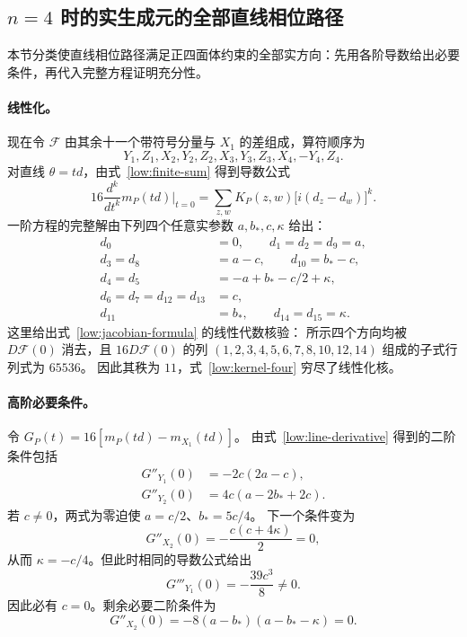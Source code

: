 \subsection{\texorpdfstring{$n=4$}{n=4} 时的实生成元的全部直线相位路径}
\label{low:app-lines}

本节分类使直线相位路径满足正四面体约束的全部实方向：先用各阶导数给出必要条件，再代入完整方程证明充分性。

\paragraph{线性化。}
现在令 $\mathcal F$ 由其余十一个带符号分量与 $X_1$ 的差组成，算符顺序为
\begin{equation*}
 Y_1,Z_1,X_2,Y_2,Z_2,X_3,Y_3,Z_3,X_4,-Y_4,Z_4.
\end{equation*}
对直线 $\theta=td$，由式~\eqref{low:finite-sum} 得到导数公式
\begin{equation}
 16\frac{d^k}{dt^k}m_P(td)\bigg|_{t=0}
 =\sum_{z,w}K_P(z,w)\bigl[i(d_z-d_w)\bigr]^k.
 \label{low:line-derivative}
\end{equation}
一阶方程的完整解由下列四个任意实参数 $a,b_*,c,\kappa$ 给出：
\begin{equation}
 \begin{aligned}
 d_0&=0,\qquad d_1=d_2=d_9=a,\\
 d_3=d_8&=a-c,\qquad d_{10}=b_*-c,\\
 d_4=d_5&=-a+b_*-c/2+\kappa,\\
 d_6=d_7=d_{12}=d_{13}&=c,\\
 d_{11}&=b_*,\qquad d_{14}=d_{15}=\kappa.
 \end{aligned}
 \label{low:kernel-four}
\end{equation}
这里给出式~\eqref{low:jacobian-formula} 的线性代数核验：
所示四个方向均被 $D\mathcal F(0)$ 消去，且 $16D\mathcal F(0)$
的列 $(1,2,3,4,5,6,7,8,10,12,14)$ 组成的子式行列式为 $65536$。
因此其秩为 $11$，式~\eqref{low:kernel-four} 穷尽了线性化核。

\paragraph{高阶必要条件。}
令 $G_P(t)=16[m_P(td)-m_{X_1}(td)]$。
由式~\eqref{low:line-derivative} 得到的二阶条件包括
\begin{align}
 G''_{Y_1}(0)&=-2c(2a-c),\nonumber\\
 G''_{Y_2}(0)&=4c(a-2b_*+2c).
 \label{low:second-order}
\end{align}
若 $c\ne0$，两式为零迫使 $a=c/2$、$b_*=5c/4$。
下一个条件变为
\begin{equation}
 G''_{X_2}(0)=-\frac{c(c+4\kappa)}2=0,
\end{equation}
从而 $\kappa=-c/4$。但此时相同的导数公式给出
\begin{equation}
 G'''_{Y_1}(0)=-\frac{39c^3}{8}\ne0.
 \label{low:third-order}
\end{equation}
因此必有 $c=0$。剩余必要二阶条件为
\begin{equation}
 G''_{X_2}(0)=-8(a-b_*)(a-b_*-\kappa)=0.
 \label{low:two-planes}
\end{equation}
